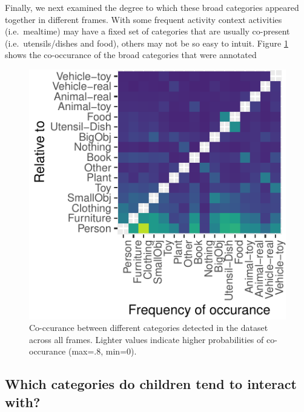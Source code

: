 \documentclass[10pt, letterpaper]{article}
\newenvironment{CodeChunk}{}{}
\begin{document}
Finally, we next examined the degree to which these broad categories
appeared together in different frames. With some frequent activity
context activities (i.e.~mealtime) may have a fixed set of categories
that are usually co-present (i.e.~utensils/dishes and food), others may
not be so easy to intuit. Figure \ref{fig:coocc_stats} shows the
co-occurance of the broad categories that were annotated

\begin{CodeChunk}
\begin{figure}[h]

{\centering \includegraphics{figs/coocc_stats-1} 

}

\caption[Co-ccurance between different categories detected in the dataset across all frames]{Co-ccurance between different categories detected in the dataset across all frames. Lighter values indicate higher probabilities of co-occurance (max=.8, min=0).}\label{fig:coocc_stats}
\end{figure}
\end{CodeChunk}

\hypertarget{which-categories-do-children-tend-to-interact-with}{%
\subsection{Which categories do children tend to interact
with?}\label{which-categories-do-children-tend-to-interact-with}}
\end{document}
